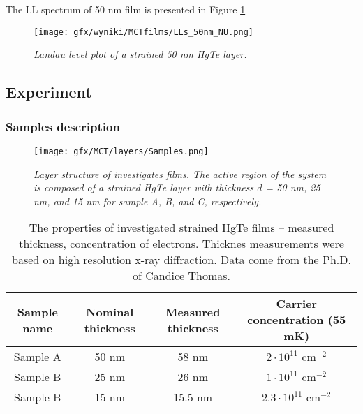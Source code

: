 \documentclass[titlepage,a4paper]{book}
\newcommand{\wciecie}{\quad\phantom{v}}
\begin{document}
The LL spectrum of 50 nm film is presented in Figure \ref{fig:LL_50nm}

\begin{figure}[ht]
	\centering
	\texttt{[image: gfx/wyniki/MCTfilms/LLs\_50nm\_NU.png]}
	\vspace{-10pt}
	\caption{\textit{Landau level plot of a strained 50 nm HgTe layer.}}
	\label{fig:LL_50nm}
\end{figure} 



\subsection{Experiment}
\subsubsection{Samples description}
\wciecie
\begin{figure}[ht]
	\centering
	\texttt{[image: gfx/MCT/layers/Samples.png]}
	\vspace{-10pt}
	\caption{\textit{Layer structure of investigates films. The active region of the system is composed of a strained HgTe layer with thickness $d$ = 50 nm, 25 nm, and 15 nm for sample A, B, and C, respectively.}}
	\label{fig:Samples_layers}
\end{figure} 

\begin{table}[h]
\label{tab:MCT_films_properties}
\caption{The properties of investigated strained HgTe films -- measured thickness, concentration of electrons. Thicknes measurements were based on high resolution x-ray diffraction. Data come from the Ph.D. of Candice Thomas.}
\vspace{10pt}
\centering
\begin{tabular}{ c | c | c | c}	
\textbf{Sample name} & \textbf{Nominal thickness} & \textbf{Measured thickness} & \textbf{Carrier concentration (55 mK)}\\
\hline\hline
Sample A & 50 nm & 58 nm & $2\cdot10^{11}$ cm$^{-2}$\\ \hline
Sample B & 25 nm & 26 nm & $1\cdot10^{11}$ cm$^{-2}$\\ \hline
Sample B & 15 nm & 15.5 nm & $2.3\cdot10^{11}$ cm$^{-2}$\\ \hline
\hline 
\end{tabular}
\end{table}
\end{document}
